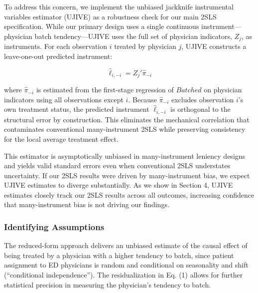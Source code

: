 \documentclass[,,blindrev]{informs}
\begin{document}
To address this concern, we implement the unbiased jackknife
instrumental variables estimator (UJIVE) as a robustness check for our
main 2SLS specification. While our primary design uses a single
continuous instrument---physician batch tendency---UJIVE uses the full
set of physician indicators, \(Z_j\), as instruments. For each
observation \(i\) treated by physician \(j\), UJIVE constructs a
leave-one-out predicted instrument:

\begin{equation}
\hat{\ell}_{i,-i} = Z_j' \hat{\pi}_{-i}
\end{equation}

where \(\hat{\pi}_{-i}\) is estimated from the first-stage regression of
\(Batched\) on physician indicators using all observations except \(i\).
Because \(\hat{\pi}_{-i}\) excludes observation \(i\)'s own treatment
status, the predicted instrument \(\hat{\ell}_{i,-i}\) is orthogonal to
the structural error by construction. This eliminates the mechanical
correlation that contaminates conventional many-instrument 2SLS while
preserving consistency for the local average treatment effect.

This estimator is asymptotically unbiased in many-instrument leniency
designs and yields valid standard errors even when conventional 2SLS
understates uncertainty. If our 2SLS results were driven by
many-instrument bias, we expect UJIVE estimates to diverge
substantially. As we show in Section 4, UJIVE estimates closely track
our 2SLS results across all outcomes, increasing confidence that
many-instrument bias is not driving our findings.

\subsubsection{Identifying
Assumptions}\label{sec:identifying_assumptions}

The reduced-form approach delivers an unbiased estimate of the causal
effect of being treated by a physician with a higher tendency to batch,
since patient assignment to ED physicians is random and conditional on
seasonality and shift (``conditional independence''). The
residualization in Eq. (1) allows for further statistical precision in
measuring the physician's tendency to batch.
\end{document}
